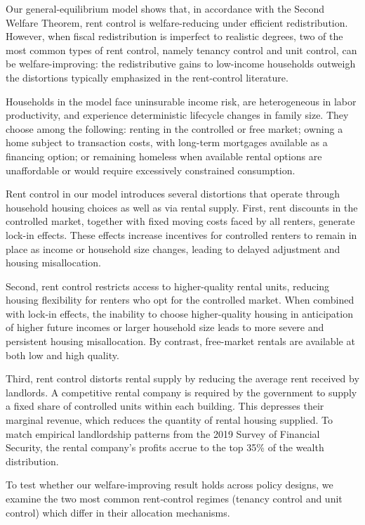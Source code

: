 \documentclass[parskip=full]{article}
\begin{document}
Our general-equilibrium model shows that, in accordance with the Second Welfare Theorem, rent control is welfare-reducing under efficient redistribution. However, when fiscal redistribution is imperfect to realistic degrees, two of the most common types of rent control, namely tenancy control and unit control, can be welfare-improving: the redistributive gains to low-income households outweigh the distortions typically emphasized in the rent-control literature.

Households in the model face uninsurable income risk, are heterogeneous in labor productivity, and experience deterministic lifecycle changes in family size. They choose among the following: renting in the controlled or free market; owning a home subject to transaction costs, with long-term mortgages available as a financing option; or remaining homeless when available rental options are unaffordable or would require excessively constrained consumption.

Rent control in our model introduces several distortions that operate through household housing choices as well as via rental supply. First, rent discounts in the controlled market, together with fixed moving costs faced by all renters, generate lock-in effects. These effects increase incentives for controlled renters to remain in place as income or household size changes, leading to delayed adjustment and housing misallocation.

Second, rent control restricts access to higher-quality rental units, reducing housing flexibility for renters who opt for the controlled market. When combined with lock-in effects, the inability to choose higher-quality housing in anticipation of higher future incomes or larger household size leads to more severe and persistent housing misallocation. By contrast, free-market rentals are available at both low and high quality.

Third, rent control distorts rental supply by reducing the average rent received by landlords. A competitive rental company is required by the government to supply a fixed share of controlled units within each building. This depresses their marginal revenue, which reduces the quantity of rental housing supplied. To match empirical landlordship patterns from the 2019 Survey of Financial Security, the rental company's profits accrue to the top 35\% of the wealth distribution. 

To test whether our welfare-improving result holds across policy designs, we examine the two most common rent‑control regimes (tenancy control and unit control) which differ in their allocation mechanisms.
\end{document}
